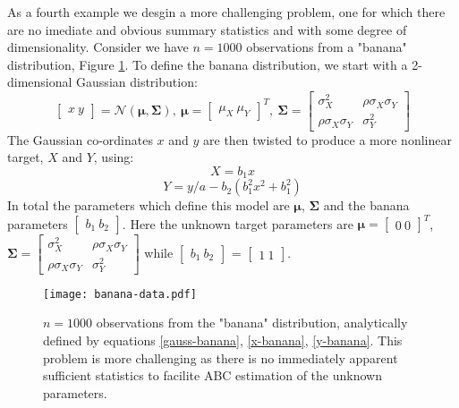 As a fourth example we desgin a more challenging problem, one for which there are no imediate and obvious summary statistics and with some degree of dimensionality. Consider we have $n = 1000$ observations from a "banana" distribution, Figure \ref{banana-data}. To define the banana distribution, we start with a 2-dimensional Gaussian distribution:
\begin{equation}
\begin{bmatrix}
x\ y
\end{bmatrix}=\mathcal{N}(\bm{\mu},\bm{\Sigma}),\ \bm{\mu} = \begin{bmatrix}
\mu_X\ \mu_Y
\end{bmatrix}^T,\ \bm{\Sigma} = \begin{bmatrix}
\sigma^2_X & \rho\sigma_X\sigma_Y\\
\rho\sigma_X\sigma_Y & \sigma^2_Y
\end{bmatrix} 
\label{gauss-banana}
\end{equation}
The Gaussian co-ordinates $x$ and $y$ are then twisted to produce a more nonlinear target, $X$ and $Y$, using:
\begin{equation}
X = b_1x
\label{x-banana}
\end{equation}
\begin{equation}
Y = y/a-b_2(b_1^2x^2+b_1^2)
\label{y-banana}
\end{equation}
In total the parameters which define this model are $\bm{\mu}$, $\bm{\Sigma}$ and the banana parameters $\begin{bmatrix}
b_1\ b_2
\end{bmatrix}$. Here the unknown target parameters are $\bm{\mu} = \begin{bmatrix}
0\ 0
\end{bmatrix}^T$,
$\bm{\Sigma} = \begin{bmatrix}
\sigma^2_X & \rho\sigma_X\sigma_Y\\
\rho\sigma_X\sigma_Y & \sigma^2_Y
\end{bmatrix}$ while $\begin{bmatrix}
b_1\ b_2
\end{bmatrix}$ = $\begin{bmatrix}
1\ 1
\end{bmatrix}$. 

\begin{figure}[H]
\centering
\texttt{[image: banana-data.pdf]}
\caption{$n = 1000$ observations from the "banana" distribution, analytically defined by equations \ref{gauss-banana}, \ref{x-banana}, \ref{y-banana}. 
This problem is more challenging as there is no immediately apparent sufficient statistics to facilite ABC estimation of the unknown parameters.}
\label{banana-data}
\end{figure}

